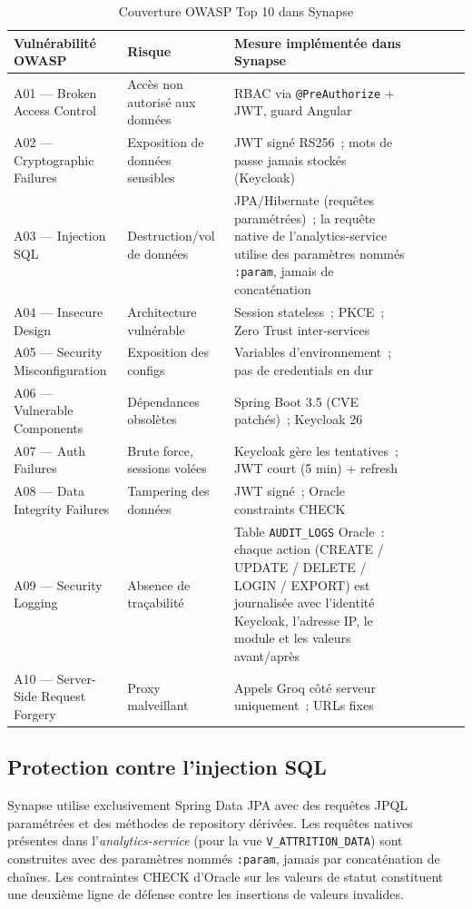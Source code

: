 \begin{table}[H]
\centering
\caption{Couverture OWASP Top 10 dans Synapse}
\label{tab:owasp}
\begin{tabularx}{\textwidth}{VlVLVLV}
\hline
\textbf{Vulnérabilité OWASP} & \textbf{Risque} & \textbf{Mesure implémentée dans Synapse} \\
\hline
A01 — Broken Access Control & Accès non autorisé aux données & RBAC via \texttt{@PreAuthorize} + JWT, guard Angular \\
\hline
A02 — Cryptographic Failures & Exposition de données sensibles & JWT signé RS256~; mots de passe jamais stockés (Keycloak) \\
\hline
A03 — Injection SQL & Destruction/vol de données & JPA/Hibernate (requêtes paramétrées)~; la requête native de l'analytics-service utilise des paramètres nommés \texttt{:param}, jamais de concaténation \\
\hline
A04 — Insecure Design & Architecture vulnérable & Session stateless~; PKCE~; Zero Trust inter-services \\
\hline
A05 — Security Misconfiguration & Exposition des configs & Variables d’environnement~; pas de credentials en dur \\
\hline
A06 — Vulnerable Components & Dépendances obsolètes & Spring Boot 3.5 (CVE patchés)~; Keycloak 26 \\
\hline
A07 — Auth Failures & Brute force, sessions volées & Keycloak gère les tentatives~; JWT court (5 min) + refresh \\
\hline
A08 — Data Integrity Failures & Tampering des données & JWT signé~; Oracle constraints CHECK \\
\hline
A09 — Security Logging & Absence de traçabilité & Table \texttt{AUDIT\_LOGS} Oracle~: chaque action (CREATE / UPDATE / DELETE / LOGIN / EXPORT) est journalisée avec l'identité Keycloak, l'adresse IP, le module et les valeurs avant/après \\
\hline
A10 — Server-Side Request Forgery & Proxy malveillant & Appels Groq côté serveur uniquement~; URLs fixes \\
\hline
\end{tabularx}
\end{table}

\subsection{Protection contre l'injection SQL}

Synapse utilise exclusivement Spring Data JPA avec des requêtes JPQL paramétrées
et des méthodes de repository dérivées. Les requêtes natives présentes dans
l'\textit{analytics-service} (pour la vue \texttt{V\_ATTRITION\_DATA}) sont
construites avec des paramètres nommés \texttt{:param}, jamais par concaténation de
chaînes. Les contraintes CHECK d'Oracle sur les valeurs de statut constituent une
deuxième ligne de défense contre les insertions de valeurs invalides.

